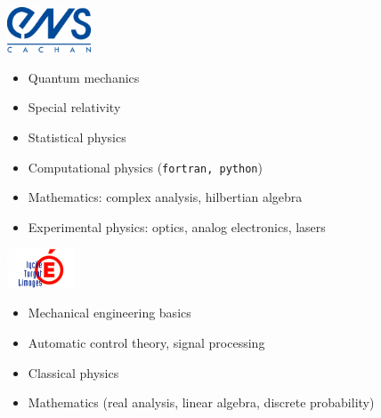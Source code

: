 \noindent
\begin{minipage}{.15\textwidth}
\centerline{\includegraphics[width=25mm]{img/ens}}
\end{minipage}
\hspace{5mm}
\begin{minipage}{.9\textwidth}
\raggedright
\begin{minipage}[t]{.30\textwidth}
	\begin{itemize}
		\item Quantum mechanics
		\item Special relativity
		\item Statistical physics
	\end{itemize}
\end{minipage}
\begin{minipage}[t]{.60\textwidth}
	\begin{itemize}
		\item Computational physics (\texttt{fortran, python})
		\item Mathematics: complex analysis, hilbertian algebra
		\item Experimental physics: optics, analog electronics, lasers
	\end{itemize}
\end{minipage}
\end{minipage}

\noindent
\begin{minipage}{.15\textwidth}
	\centerline{\includegraphics[width=20mm]{img/turgot}}
\end{minipage}%
\hspace{5mm}
\begin{minipage}{.7\textwidth}
	\raggedright
	\begin{itemize}
		\item Mechanical engineering basics
		\item Automatic control theory, signal processing
		\item Classical physics
		\item Mathematics (real analysis, linear algebra, discrete probability)
	\end{itemize}
\end{minipage}
